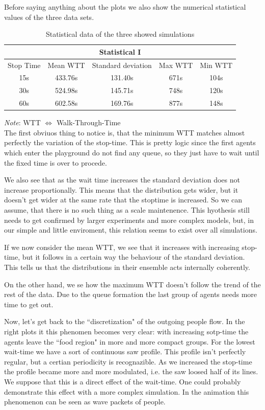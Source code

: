 \documentclass[11pt]{article}
\begin{document}
Before saying anything about the plots we also show the numerical statistical values of the three data sets.

\begin{table}[h]
\begin{center}
\begin{tabular}{c|c|c|c|c}

\multicolumn{5}{c}{Statistical I}\\
\hline
\hline
Stop Time		&Mean WTT		&Standard deviation		&Max WTT	&Min WTT	\\
\hline
15s			&433.76s			&131.40s				&671s		&104s\\
\hline
30s			&524.98s			&145.71s				&748s		&120s\\
\hline
60s			&602.58s			&169.76s				&877s		&148s\\
\hline
\end{tabular}
\end{center}
\caption{Statistical data of the three showed simulations}
\end{table}
\emph{Note}: WTT $\Leftrightarrow$ Walk-Through-Time\\

The first obviuos thing to notice is, that the minimum WTT matches almost perfectly the variation of the stop-time. This is pretty logic since the first agents which enter the playground do not find any queue, so they just have to wait until the fixed time is over to procede.

We also see that as the wait time increases the standard deviation does not increase proportionally. This means that the distribution gets wider, but it doesn't get wider at the same rate that the stoptime is increased. So we can assume, that there is no such thing as a scale maintenence. This hyothesis still needs to get confirmed by larger experiments and more complex models, but, in our simple and little enviroment, this relation seems to exist over all simulations.

If we now consider the mean WTT, we see that it increases with increasing stop-time, but it follows in a certain way the behaviour of the standard deviation. This tells us that the distributions in their ensemble acts internally coherently.

On the other hand, we se how the maximum WTT doesn't follow the trend of the rest of the data. Due to the queue formation the last group of agents needs more time to get out.

Now, let's get back to the ``discretization" of the outgoing people flow. In the right plots it this phenomen becomes very clear: with increasing sotp-time the agents leave the ``food region" in more and more compact groups. For the lowest wait-time we have a sort of continuous saw profile. This profile isn't perfectly regular, but a certian periodicity is recognazible. As we increased the stop-time the profile became more and more modulated, i.e. the saw loosed half of its lines. We suppose that this is a direct effect of  the wait-time. One could probably demonstrate this effect with a more complex simulation. In the animation this phenomenon can be seen as wave packets of people.
\end{document}
